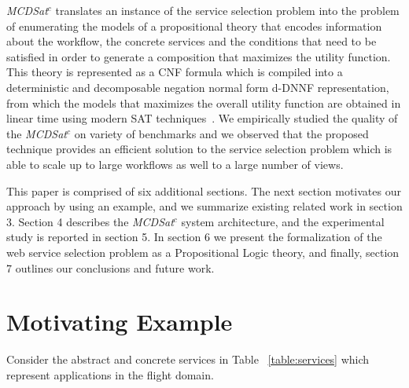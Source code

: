 \documentclass{llncs}
\begin{document}
{\it MCDSat}$^c$  translates an instance of the service selection problem into the problem of enumerating the models of a propositional theory that encodes information about the workflow, the concrete services and the conditions that need to be satisfied in order to generate a composition that maximizes the utility function. This theory is represented as a CNF formula which is compiled into a deterministic
and decomposable negation normal form d-DNNF representation, from which the models that maximizes the overall utility function are obtained in linear time using modern SAT techniques~\cite{darwiche:dnnf}.   
We empirically studied the quality of the {\it MCDSat}$^c$ on variety of benchmarks and we observed  that the proposed technique provides an efficient solution to the service selection problem which is able to scale up to large workflows as well to a large number of views.   

 This paper is comprised of six additional sections. The next section motivates our approach by using an example, and  we summarize existing related work in section 3. Section 4 describes the {\it MCDSat}$^c$ system architecture, and  the experimental study is reported in section 5. 
 In section 6 we present the formalization of the web service selection problem as a Propositional Logic theory, and finally, section 7 outlines our conclusions and future work.


\section{Motivating Example}
Consider the abstract and concrete services in Table ~\ref{table:services}  which represent applications in the flight domain.
\end{document}
